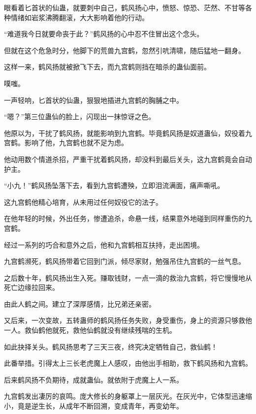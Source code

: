 
\begin{this_body}

眼看着匕首状的仙蛊，就要刺中自己，鹤风扬心中，愤怒、惊恐、茫然、不甘等各种情绪如岩浆沸腾翻滚，大大影响着他的行动。

“难道我今日就要命丧于此？”鹤风扬的心中忍不住冒出这个念头。

但就在这个危急时分，他脚下的荒兽九宫鹤，忽然引吭清啸，随后猛地一翻身。

这样一来，鹤风扬就被掀飞下去，而九宫鹤则挡在暗杀的蛊仙面前。

噗嗤。

一声轻响，匕首状的仙蛊，狠狠地插进九宫鹤的胸脯之中。

“嗯？”第三位蛊仙的脸上，闪现出一抹惊讶之色。

他原以为，干扰了鹤风扬，就能影响到九宫鹤。毕竟鹤风扬是奴道蛊仙，奴役着九宫鹤。影响了他，九宫鹤也就不足为虑。

他动用数个情道杀招，严重干扰着鹤风扬，却没料到最后关头，这九宫鹤竟会自动护主。

“小九！”鹤风扬坠落下去，看到九宫鹤遭殃，立即泪流满面，痛声嘶吼。

这九宫鹤他精心培育，从未用过任何奴役它的法子。

在他年轻的时候，外出任务，惨遭追杀，命悬一线，结果意外地碰到同样重伤的九宫鹤。

经过一系列的巧合和意外之后，他和九宫鹤相互扶持，走出困境。

九宫鹤濒死，鹤风扬带着它回到门派，倾尽家财，勉强吊住九宫鹤的一丝气息。

之后数十年，鹤风扬出生入死。赚取钱财，一点一滴的救治九宫鹤，将它慢慢地从死亡边缘拉回来。

由此人鹤之间。建立了深厚感情，比兄弟还亲密。

又后来，一次变故，五转蛊师的鹤风扬任务失败，身受重伤，身上的资源只够救他一人。救仙鹤他就死，救他仙鹤就没有继续残喘的生机。

如此抉择关头。鹤风扬思考了三天三夜，终究决定牺牲自己，救仙鹤！

此番举措。引得太上三长老虎魔上人感叹，由他出手相助，救下鹤风扬和九宫鹤。

后来鹤风扬不负期待，成就蛊仙。就依附于虎魔上人一系。

九宫鹤发出凄厉的哀鸣。庞大修长的身躯罩上一层灰光。在灰光中，它体型迅速缩小，竟是逆生长，从成年不断回溯，变成青年，再变幼年。


\end{this_body}
